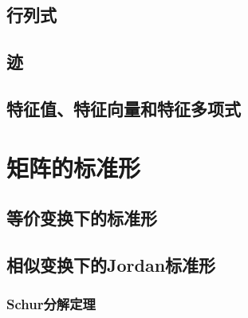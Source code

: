\begin{definition}
\end{definition}

\subsection{行列式}
\label{sub:行列式}

\begin{definition}
\end{definition}

\subsection{迹}
\label{sub:迹}

\begin{definition}
\end{definition}

\subsection{特征值、特征向量和特征多项式}
\label{sub:特征值、特征向量和特征多项式}

\begin{definition}
\end{definition}

\begin{definition}
\end{definition}

\section{矩阵的标准形}
\label{sec:矩阵的标准形}

\subsection{等价变换下的标准形}
\label{sub:等价变换下的标准形}

\begin{definition}
\end{definition}

\subsection{相似变换下的Jordan标准形}
\label{sub:相似变换下的Jordan标准形}

\subsubsection{Schur分解定理}
\label{ssub:schurfen_jie_ding_li_}

